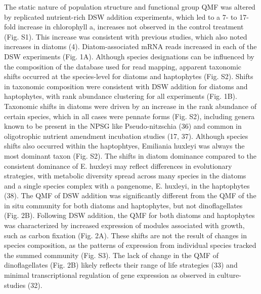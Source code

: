 The static nature of population structure and functional group QMF was altered by replicated nutrient-rich DSW addition experiments, which led to a 7- to 17-fold increase in chlorophyll a, increases not observed in the control treatment (Fig. S1). This increase was consistent with previous studies, which also noted increases in diatoms (4). Diatom-associated mRNA reads increased in each of the DSW experiments (Fig. 1A). Although species designations can be influenced by the composition of the database used for read mapping, apparent taxonomic shifts occurred at the species-level for diatoms and haptophytes (Fig. S2). Shifts in taxonomic composition were consistent with DSW addition for diatoms and haptophytes, with rank abundance clustering for all experiments (Fig. 1B).  Taxonomic shifts in diatoms were driven by an increase in the rank abundance of certain species, which in all cases were pennate forms (Fig. S2), including genera known to be present in the NPSG like Pseudo-nitzschia (36) and common in oligotrophic nutrient amendment incubation studies (17, 37). Although species shifts also occurred within the haptophtyes, Emiliania huxleyi was always the most dominant taxon (Fig. S2). The shifts in diatom dominance compared to the consistent dominance of E. huxleyi may reflect differences in evolutionary strategies, with metabolic diversity spread across many species in the diatoms and a single species complex with a pangenome, E. huxleyi, in the haptophytes (38). The QMF of DSW addition was significantly different from the QMF of the in situ community for both diatoms and haptophytes, but not dinoflagellates (Fig. 2B). Following DSW addition, the QMF for both diatoms and haptophytes was characterized by increased expression of modules associated with growth, such as carbon fixation (Fig. 2A). These shifts are not the result of changes in species composition, as the patterns of expression from individual species tracked the summed community (Fig. S3). The lack of change in the QMF of dinoflagellates (Fig. 2B) likely reflects their range of life strategies (33) and minimal transcriptional regulation of gene expression as observed in culture-studies (32). 
